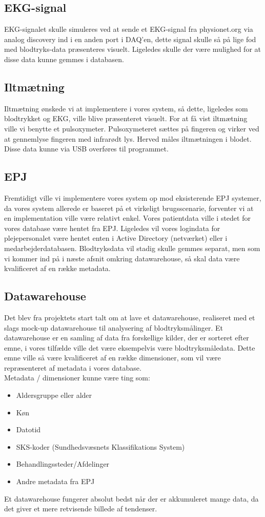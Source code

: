 \subsection{EKG-signal}
EKG-signalet skulle  simuleres ved at sende et EKG-signal fra physionet.org via analog discovery ind i en anden port i DAQ’en, dette signal skulle så på lige fod med blodtryks-data præsenteres visuelt. Ligeledes skulle der være mulighed for at disse data kunne gemmes i databasen.
\subsection{Iltmætning}
Iltmætning ønskede vi at implementere i vores system, så dette, ligeledes som blodtrykket og EKG, ville blive præsenteret visuelt. For at få vist iltmætning ville vi benytte et pulsoxymeter. Pulsoxymeteret sættes på fingeren og virker ved at gennemlyse fingeren med infrarødt lys. Herved måles iltmætningen i blodet. Disse data kunne via USB overføres til programmet. 
\subsection{EPJ}
Fremtidigt ville vi implementere vores system op mod eksisterende EPJ systemer, da vores system allerede er baseret på et virkeligt brugsscenarie, forventer vi at en implementation ville være relativt enkel. Vores patientdata ville i stedet for vores database være hentet fra EPJ.  Ligeledes vil vores logindata for plejepersonalet være hentet enten i Active Directory (netværket) eller i medarbejderdatabasen. Blodtryksdata vil stadig skulle gemmes separat, men som vi kommer ind på i næste afsnit omkring datawarehouse, så skal data være kvalificeret af en række metadata.
\subsection{Datawarehouse}
Det blev fra projektets start talt om at lave et datawarehouse, realiseret med et slags mock-up datawarehouse til analysering af blodtryksmålinger. Et datawarehouse er en samling af data fra forskellige kilder, der er sorteret efter emne, i vores tilfælde ville det være eksempelvis være blodtryksmåledata. Dette emne ville så være kvalificeret af en række dimensioner, som vil være repræsenteret af metadata i vores database.\\ 
Metadata / dimensioner kunne være ting som:
\begin{itemize}
\item Aldersgruppe eller alder
\item Køn
\item Datotid
\item SKS-koder (Sundhedsvæsnets Klassifikations System)
\item Behandlingssteder/Afdelinger
\item Andre metadata fra EPJ
\end{itemize}
Et datawarehouse fungerer absolut bedst når der er akkumuleret mange data, da det giver et mere retvisende billede af tendenser. 
